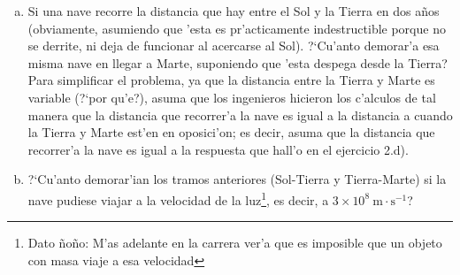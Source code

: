 \documentclass{article}
\begin{document}
\begin{enumerate} [a)]
\item Si una nave recorre la distancia que hay entre el Sol y la Tierra en dos años (obviamente, asumiendo que 'esta es pr'acticamente indestructible porque no se derrite, ni deja de funcionar al acercarse al Sol). ?`Cu'anto demorar'a esa misma nave en llegar a Marte, suponiendo que 'esta despega desde la Tierra? Para simplificar el problema, ya que la distancia entre la Tierra y Marte es variable (?`por qu'e?), asuma que los ingenieros hicieron los c'alculos de tal manera que la distancia que recorrer'a la nave es igual a la distancia a cuando la Tierra y Marte est'en en oposici'on; es decir, asuma que la distancia que recorrer'a la nave es igual a la respuesta que hall'o en el ejercicio 2.d).

\item ?`Cu'anto demorar'ian los tramos anteriores (Sol-Tierra y Tierra-Marte) si la nave pudiese viajar a la velocidad de la luz\footnote{Dato ñoño: M'as adelante en la carrera ver'a que es imposible que un objeto con masa viaje a esa velocidad}, es decir, a $3 \times 10^8 \ \text{m}\cdot \text{s}^{-1}$? 
\end{enumerate}

\vspace{4mm}
\end{document}
